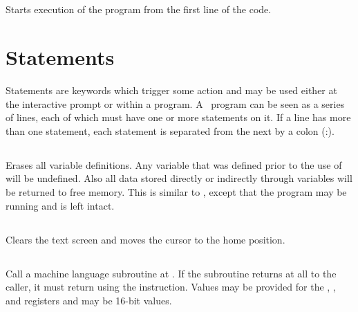 \documentclass{report}
\begin{document}
    \subsection*{}

    Starts execution of the program from the first line of the code.


    \section*{Statements}

    Statements are keywords which trigger some action and may be used either at the interactive prompt or within a program.
    A \BASIC\ program can be seen as a series of lines, each of which must have one or more statements on it.
    If a line has more than one statement, each statement is separated from the next by a colon (:).

    \subsection*{}

    Erases all variable definitions. Any variable that was defined prior to the use of  will be undefined.
    Also all data stored directly or indirectly through variables will be returned to free memory. This is similar to
    , except that the program may be running and is left intact.

    \subsection*{}

    Clears the text screen and moves the cursor to the home position.

    \subsection*{}

    Call a machine language subroutine at . If the subroutine returns at all to the caller, it
    must return using the  instruction. Values may be provided for the , , and
     registers and may be 16-bit values.

    \subsection*{}
\end{document}

